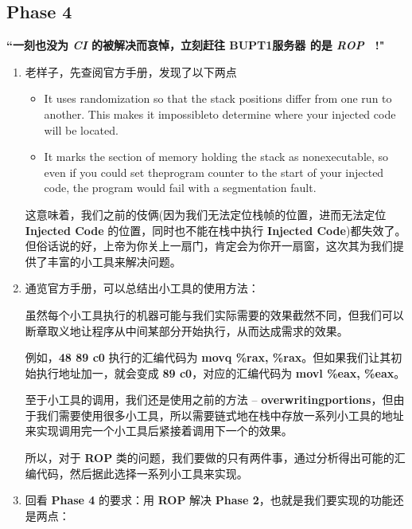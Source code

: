     \subsection{Phase 4}
        \par \textbf{``一刻也没为 \textit{CI} 的被解决而哀悼，立刻赶往 BUPT1服务器 的是 \textit{ROP \ }!"}
        \begin{enumerate}
            \item 老样子，先查阅官方手册，发现了以下两点
                \begin{itemize}
                    \item It uses randomization so that the stack positions differ from one run to another. This makes it impossibleto determine where your injected code will be located.
                    \item It marks the section of memory holding the stack as nonexecutable, so even if you could set theprogram counter to the start of your injected code, the program would fail with a segmentation fault.
                \end{itemize}
                \par 这意味着，我们之前的伎俩(因为我们无法定位栈帧的位置，进而无法定位 \textbf{Injected Code} 的位置，同时也不能在栈中执行 \textbf{Injected Code})都失效了。但俗话说的好，上帝为你关上一扇门，肯定会为你开一扇窗，这次其为我们提供了丰富的小工具来解决问题。
            \item 通览官方手册，可以总结出小工具的使用方法：
                \begin{mquote}
                    \par 虽然每个小工具执行的机器可能与我们实际需要的效果截然不同，但我们可以断章取义地让程序从中间某部分开始执行，从而达成需求的效果。
                    \par 例如，\textbf{48 89 c0} 执行的汇编代码为 \textbf{movq \%rax, \%rax}。但如果我们让其初始执行地址加一，就会变成 \textbf{89 c0}，对应的汇编代码为 \textbf{movl \%eax, \%eax}。
                    \par 至于小工具的调用，我们还是使用之前的方法 -- \textbf{overwritingportions}，但由于我们需要使用很多小工具，所以需要链式地在栈中存放一系列小工具的地址来实现调用完一个小工具后紧接着调用下一个的效果。
                    \par 所以，对于 \textbf{ROP} 类的问题，我们要做的只有两件事，通过分析得出可能的汇编代码，然后据此选择一系列小工具来实现。
                \end{mquote}
            \item 回看 \textbf{Phase 4} 的要求：用 \textbf{ROP} 解决 \textbf{Phase 2}，也就是我们要实现的功能还是两点：

\end{enumerate}
